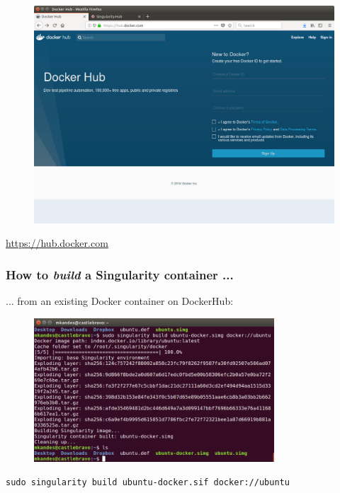 \documentclass{beamer}
\begin{document}
\begin{frame}
   \frametitle{}
   \begin{figure}[htbp]
      \includegraphics[width=1.0\textwidth]{images/docker-hub-homepage.png}
   \end{figure}
   \begin{center}
      \url{https://hub.docker.com}
   \end{center}
\end{frame}

\begin{frame}
   \frametitle{How to \textit{build} a Singularity container ...}
   ... from an existing Docker container on DockerHub:
   \begin{figure}[htbp]
      \includegraphics[width=0.8\textwidth]{images/singularity-build-docker.png}
   \end{figure}
   \lstinline{sudo singularity build ubuntu-docker.sif docker://ubuntu}
\end{frame}
\end{document}
